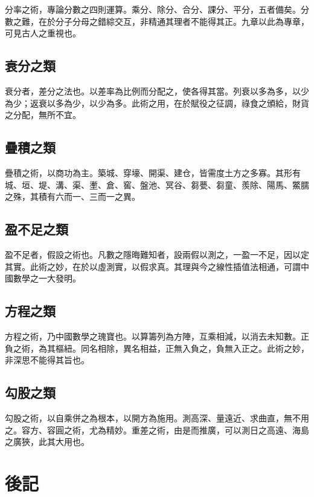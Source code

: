 \documentclass[11pt,a4paper]{article}
\begin{document}
分率之術，專論分數之四則運算。乘分、除分、合分、課分、平分，五者備矣。分數之難，在於分子分母之錯綜交互，非精通其理者不能得其正。九章以此為專章，可見古人之重視也。

\subsection*{衰分之類}

衰分者，差分之法也。以差率為比例而分配之，使各得其當。列衰以多為多，以少為少；返衰以多為少，以少為多。此術之用，在於賦役之征調，祿食之頒給，財貨之分配，無所不宜。

\subsection*{疊積之類}

疊積之術，以商功為主。築城、穿壕、開渠、建仓，皆需度土方之多寡。其形有城、垣、堤、溝、渠、壍、倉、窖、盤池、冥谷、芻甍、芻童、羨除、陽馬、鱉臑之殊，其積有六而一、三而一之異。

\subsection*{盈不足之類}

盈不足者，假設之術也。凡數之隱晦難知者，設兩假以測之，一盈一不足，因以定其實。此術之妙，在於以虛測實，以假求真。其理與今之線性插值法相通，可謂中國數學之一大發明。

\subsection*{方程之類}

方程之術，乃中國數學之瑰寶也。以算籌列為方陣，互乘相減，以消去未知數。正負之術，為其樞紐。同名相除，異名相益，正無入負之，負無入正之。此術之妙，非深思不能得其旨也。

\subsection*{勾股之類}

勾股之術，以自乘併之為根本，以開方為施用。測高深、量遠近、求曲直，無不用之。容方、容圓之術，尤為精妙。重差之術，由是而推廣，可以測日之高遠、海島之廣狹，此其大用也。

\newpage

\section*{後記}
\end{document}
